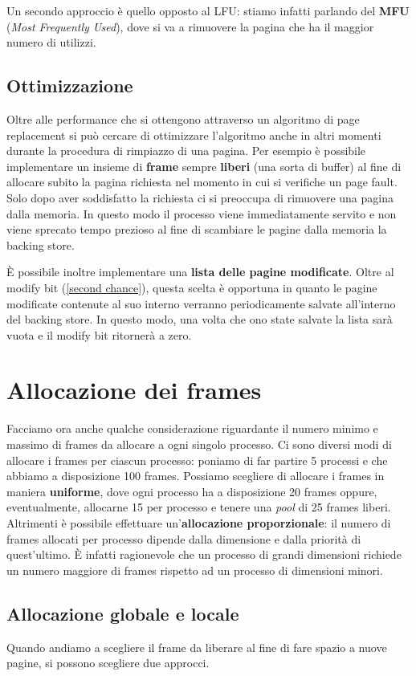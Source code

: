 Un secondo approccio è quello opposto al LFU: stiamo infatti parlando del \textbf{MFU} (\textit{Most Frequently Used}), dove si va a rimuovere la pagina che ha il maggior numero di utilizzi.  

% 
\subsection{Ottimizzazione}
Oltre alle performance che si ottengono attraverso un algoritmo di page replacement si può cercare di ottimizzare l'algoritmo anche in altri momenti durante la procedura di rimpiazzo di una pagina. Per esempio è possibile implementare un insieme di \textbf{frame} sempre \textbf{liberi} (una sorta di buffer) al fine di allocare subito la pagina richiesta nel momento in cui si verifiche un page fault. Solo dopo aver soddisfatto la richiesta ci si preoccupa di rimuovere una pagina dalla memoria. In questo modo il processo viene immediatamente servito e non viene sprecato tempo prezioso al fine di scambiare le pagine dalla memoria la backing store. 

È possibile inoltre implementare una \textbf{lista delle pagine modificate}. Oltre al modify bit (\ref{second chance}), questa scelta è opportuna in quanto le pagine modificate contenute al suo interno verranno periodicamente salvate all'interno del backing store. In questo modo, una volta che ono state salvate la lista sarà vuota e il modify bit ritornerà a zero. 

%
\section{Allocazione dei frames}
Facciamo ora anche qualche considerazione riguardante il numero minimo e massimo di frames da allocare a ogni singolo processo. Ci sono diversi modi di allocare i frames per ciascun processo: poniamo di far partire 5 processi e che abbiamo a disposizione 100 frames. Possiamo scegliere di allocare i frames in maniera \textbf{uniforme}, dove ogni processo ha a disposizione 20 frames oppure, eventualmente, allocarne 15 per processo e tenere una \textit{pool} di 25 frames liberi. Altrimenti è possibile effettuare un'\textbf{allocazione proporzionale}: il numero di frames allocati per processo dipende dalla dimensione e dalla priorità di quest'ultimo. È infatti ragionevole che un processo di grandi dimensioni richiede un numero maggiore di frames rispetto ad un processo di dimensioni minori.

% 
\subsection{Allocazione globale e locale}
Quando andiamo a scegliere il frame da liberare al fine di fare spazio a nuove pagine, si possono scegliere due approcci.

